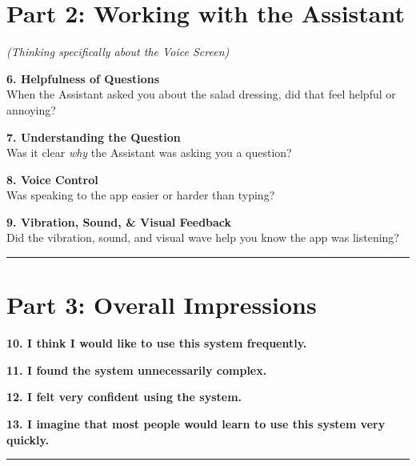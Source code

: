 \clearpage

\section*{Part 2: Working with the Assistant}
\textit{(Thinking specifically about the Voice Screen)}

\vspace{1em}

\noindent \textbf{6. Helpfulness of Questions} \\
When the Assistant asked you about the salad dressing, did that feel helpful or annoying?

\noindent \textbf{7. Understanding the Question} \\
Was it clear \textit{why} the Assistant was asking you a question?

\noindent \textbf{8. Voice Control} \\
Was speaking to the app easier or harder than typing?

\noindent \textbf{9. Vibration, Sound, \& Visual Feedback} \\
Did the vibration, sound, and visual wave help you know the app was listening?

\vspace{0.5cm}
\hrule
\vspace{0.5cm}

\section*{Part 3: Overall Impressions}

\vspace{1em}

\noindent \textbf{10. I think I would like to use this system frequently.}

\noindent \textbf{11. I found the system unnecessarily complex.}

\noindent \textbf{12. I felt very confident using the system.}

\noindent \textbf{13. I imagine that most people would learn to use this system very quickly.}

\vspace{0.5cm}
\hrule
\vspace{0.5cm}

